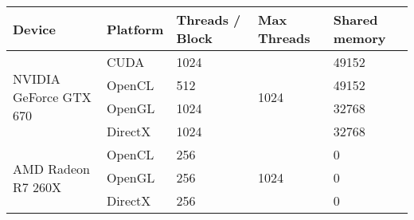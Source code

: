 \begin{tabular}{|l|l|l|l|l|}
	\hline
	Device & Platform & Threads / Block & Max Threads & Shared memory \\ \hline
	\multirow{4}{*}{NVIDIA GeForce GTX 670} & CUDA & 1024 & \multirow{4}{*}{1024} & 49152 \\
	& OpenCL & 512 & {} & 49152 \\
	& OpenGL & 1024 & {} & 32768 \\
	& DirectX & 1024 & {} & 32768 \\ \hline
	\multirow{4}{*}{AMD Radeon R7 260X} & OpenCL & 256 & \multirow{4}{*}{1024} & 0 \\
	& OpenGL & 256 & {} & 0 \\
	& DirectX & 256 & {} & 0 \\ \hline
\end{tabular}